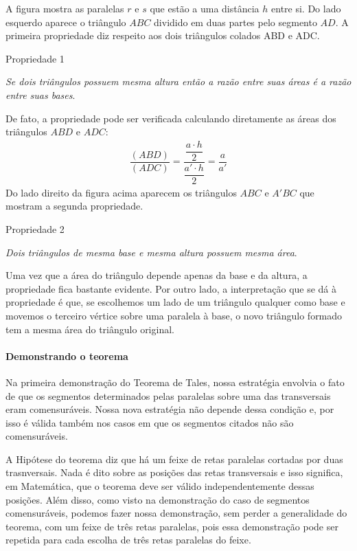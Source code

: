 A figura mostra as paralelas \(r\) e \(s\) que estão a uma distância \(h\) entre si. Do lado esquerdo aparece o triângulo \(ABC\) dividido em duas partes pelo segmento \(AD\). A primeira propriedade diz respeito aos dois triângulos colados ABD e ADC.

\begin{observationtitle}{Propriedade 1}

\textit{Se dois triângulos possuem mesma altura então a razão entre suas áreas é a razão entre suas bases}.
\end{observationtitle}

De fato, a propriedade pode ser verificada calculando diretamente as áreas dos triângulos \(ABD\) e \(ADC\):
\begin{equation*}
\begin{split}\dfrac{(ABD)}{(ADC)}=\dfrac{\dfrac{a\cdot h}{2}}{\dfrac{a'\cdot h}{2}}=\dfrac{a}{a'}\end{split}
\end{equation*}
Do lado direito da figura acima aparecem os triângulos \(ABC\) e \(A'BC\) que mostram a segunda propriedade.

\begin{observationtitle}{Propriedade 2}

\textit{Dois triângulos de mesma base e mesma altura possuem mesma área}.
\end{observationtitle}

Uma vez que a área do triângulo depende apenas da base e da altura, a propriedade fica bastante evidente. Por outro lado, a interpretação que se dá à propriedade é que, se escolhemos um lado de um triângulo qualquer como base e movemos o terceiro vértice sobre uma paralela à base, o novo triângulo formado tem a mesma área do triângulo original.


\paragraph{Demonstrando o teorema}

Na primeira demonstração do Teorema de Tales, nossa estratégia envolvia o fato de que os segmentos determinados pelas paralelas sobre uma das transversais eram comensuráveis. Nossa nova estratégia não depende dessa condição e, por isso é válida também nos casos em que os segmentos citados não são comensuráveis.

A Hipótese do teorema diz que há um feixe de retas paralelas cortadas por duas trasnversais. Nada é dito sobre as posições das retas transversais e isso significa, em Matemática, que o teorema deve ser válido independentemente dessas posições. Além disso, como visto na demonstração do caso de segmentos comensuráveis, podemos fazer nossa demonstração, sem perder a generalidade do teorema, com um feixe de três retas paralelas, pois essa demonstração pode ser repetida para cada escolha de três retas paralelas do feixe.


